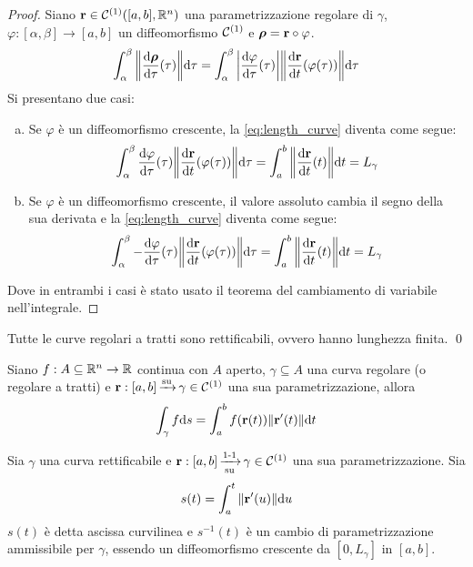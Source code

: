 \begin{proof}
	Siano $\vb{r}\in\mathcal{C}^{(1)}([a,b],\mathbb{R}^n)$ una parametrizzazione regolare di $\gamma$, $\varphi:[\alpha,\beta]\to[a,b]$ un diffeomorfismo $\mathcal{C}^{(1)}$ e $\bm{\rho}=\vb{r}\circ\varphi$.
	\begin{equation}\label{eq:length_curve}
		\int_{\alpha}^{\beta}\norm{\frac{\dd \bm\rho}{\dd \tau}(\tau)}\dd \tau
		=\int_{\alpha}^{\beta}\abs{\frac{\dd \varphi}{\dd \tau}(\tau)}\norm{\frac{\dd \vb{r}}{\dd t}(\varphi(\tau))}\dd \tau
	\end{equation}
	Si presentano due casi:
	\begin{enumerate}[a.]
		\item Se $\varphi$ è un diffeomorfismo crescente, la \eqref{eq:length_curve} diventa come segue:
		$$
			\int_{\alpha}^{\beta}\frac{\dd \varphi}{\dd \tau}(\tau)\norm{\frac{\dd \vb{r}}{\dd t}(\varphi(\tau))}\dd \tau=\int_{a}^{b}\norm{\frac{\dd \vb{r}}{\dd t}(t)}\dd t=L_\gamma
		$$
		\item Se $\varphi$ è un diffeomorfismo crescente, il valore assoluto cambia il segno della sua derivata e la \eqref{eq:length_curve} diventa come segue:
		$$
		\int_{\alpha}^{\beta}-\frac{\dd \varphi}{\dd \tau}(\tau)\norm{\frac{\dd \vb{r}}{\dd t}(\varphi(\tau))}\dd \tau=\int_{a}^{b}\norm{\frac{\dd \vb{r}}{\dd t}(t)}\dd t=L_\gamma
		$$
	\end{enumerate}
	Dove in entrambi i casi è stato usato il teorema del cambiamento di variabile nell'integrale.
\end{proof}

\begin{prop}
	Tutte le curve regolari a tratti sono rettificabili, ovvero hanno lunghezza finita.
	\qed
\end{prop}

\begin{definition}
	Siano $f: A\subseteq\mathbb{R}^n \to \mathbb{R}$ continua con $A$ aperto, $\gamma \subseteq A$ una curva regolare (o regolare a tratti) e $\vb{r}:[a,b]\operatorname{\xrightarrow{\operatorname{su}}} \gamma \in \mathcal{C}^{(1)}$ una sua parametrizzazione, allora
	$$
		\int_\gamma f \dd s = \int_a^b f(\vb{r}(t))\norm{\vb{r}'(t)}\dd t
	$$
\end{definition}

\begin{definition}
	Sia $\gamma$ una curva rettificabile e $\vb{r}:[a,b]\operatorname{\xrightarrow[\operatorname{su}]{\operatorname{1-1}}}\gamma \in \mathcal{C}^{(1)}$ una sua parametrizzazione. Sia
	$$
		s(t)=\int_a^t\norm{\vb{r}'(u)}\dd u
	$$
	$s(t)$ è detta ascissa curvilinea e $s^{-1}(t)$ è un cambio di parametrizzazione ammissibile per $\gamma$, essendo un diffeomorfismo crescente da $[0,L_\gamma]$ in $[a,b]$.
\end{definition}


